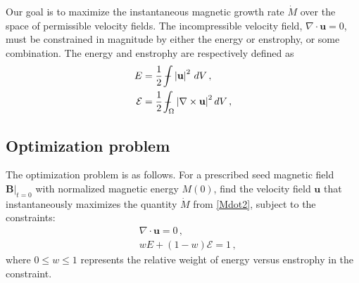 \documentclass[onecolumn,showpacs,preprintnumbers,amsmath,amssymb]{revtex4-2}
\newcommand{\bvec}[1]{{\mathbf{#1}}}
\newcommand{\grad}{\nabla}
\newcommand{\abs}[1]{\left| #1 \right|}
\newcommand{\uu}{\bvec{u}}
\newcommand{\Bvec}{\bvec{B}}
\newcommand{\jvec}{\bvec{j}}
\newcommand{\weight}{w}
\def\Xint#1{\mathchoice
   {\XXint\displaystyle\textstyle{#1}}%
   {\XXint\textstyle\scriptstyle{#1}}%
   {\XXint\scriptstyle\scriptscriptstyle{#1}}%
   {\XXint\scriptscriptstyle\scriptscriptstyle{#1}}%
   \!\int}
\def\XXint#1#2#3{{\setbox0=\hbox{$#1{#2#3}{\int}$}
     \vcenter{\hbox{$#2#3$}}\kern-.5\wd0}}
\def\dashint{\Xint-}
\begin{document}

Our goal is to maximize the instantaneous magnetic growth rate $\dot{M}$ over the space of permissible velocity fields. The incompressible velocity field, $\grad \cdot \uu = 0$, must be constrained in magnitude by either the energy or enstrophy, or some combination. The energy and enstrophy are respectively defined as
\begin{align}
\label{kinetic_energy}
E &= \frac{1}{2} \, \dashint \abs{\uu}^2 \, dV \, , \\
\label{enstrophy}
\mathcal{E} &= \frac{1}{2} \, \dashint_{\Omega} \abs{\grad \times \uu}^2 dV \, ,
\end{align}


\subsection{Optimization problem}

The optimization problem is as follows. For a prescribed seed magnetic field $\Bvec \vert_{t=0}$ with normalized magnetic energy $M(0)$, find the velocity field $\uu$ that instantaneously maximizes the quantity $\dot{M}$ from \cref{Mdot2}, subject to the constraints:
\begin{align}\
\label{div_free}
& \grad \cdot \uu = 0 \, , \\
\label{energy_enstrophy}
& \weight E + (1-\weight) \mathcal{E} = 1 \, ,
\end{align}
where $ 0 \le \weight \le 1$ represents the relative weight of energy versus enstrophy in the constraint. 
\end{document}
